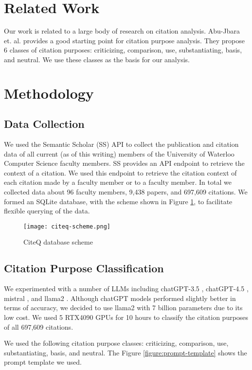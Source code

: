 \documentclass[sigconf]{acmart}
\begin{document}
\section{Related Work}
Our work is related to a large body of research on citation analysis. Abu-Jbara et. al. \cite{abu2013purpose} provides a good starting point for citation purpose analysis. They propose 6 classes of citation purposes: criticizing, comparison, use, substantiating, basis, and neutral. We use these classes as the basis for our analysis.

\section{Methodology}
\subsection{Data Collection}
We used the Semantic Scholar (SS) API to collect the publication and citation data of all current (as of this writing) members of the University of Waterloo Computer Science faculty members. SS provides an API endpoint to retrieve the context of a citation. We used this endpoint to retrieve the citation context of each citation
made by a faculty member or to a faculty member. In total we collected data about 96 faculty members, 9,438 papers, and 697,609 citations. We formed an SQLite database, with the scheme shown in Figure \ref{fig:citeq-scheme}, to facilitate flexible querying of the data.

\begin{figure}[h]
    \centering
    \texttt{[image: citeq-scheme.png]}
    \caption{CiteQ database scheme}
    \label{fig:citeq-scheme}
\end{figure}

\subsection{Citation Purpose Classification}
We experimented with a number of LLMs including chatGPT-3.5 \cite{brown2020language}, chatGPT-4.5 \cite{openai2023gpt4}, mistral \cite{jiang2023mistral}, and llama2 \cite{touvron2023llama}. Although chatGPT models performed slightly better in terms of accuracy, we decided to use llama2 with 7 billion parameters due to its low cost. We used 5 RTX4090 GPUs for 10 hours to classify the citation purposes of all 697,609 citations.

We used the following citation purpose classes: criticizing, comparison, use, substantiating, basis, and neutral. The Figure \ref{figure:prompt-template} shows the prompt template we used.
\end{document}
